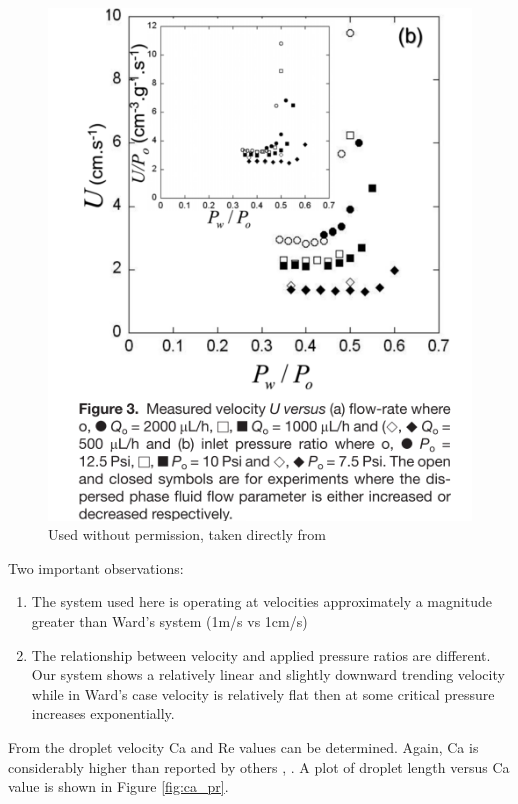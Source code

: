 \begin{figure}[h]
\centering 
\includegraphics[width=0.75\columnwidth]{wardVelocity.PNG} 
\caption[Velocity, U as a function of applied pressure]{Used without permission, taken directly from \cite{Ward2005} }
\label{fig:wardVelocity} 
\end{figure}

\clearpage

Two important observations:
\begin{enumerate}
\item The system used here is operating at velocities approximately a magnitude greater than Ward's system (1m/s vs 1cm/s)
\item The relationship between velocity and applied pressure ratios are different. Our system shows a relatively linear and slightly downward trending velocity while in Ward's case velocity is relatively flat then at some critical pressure increases exponentially.
\end{enumerate}


From the droplet velocity Ca and Re values can be determined. Again, Ca is considerably higher than reported by others \cite{DeMenech2008}, \cite{Ward2005} . A plot of droplet length versus Ca value is shown in Figure \vref{fig:ca_pr}.

